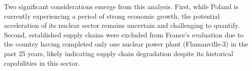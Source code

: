 Two significant considerations emerge from this analysis. First, while Poland is currently experiencing a period of strong economic growth, the potential acceleration of its nuclear sector remains uncertain and challenging to quantify. Second, established supply chains were excluded from France's evaluation due to the country having completed only one nuclear power plant (Flamanville-3) in the past 25 years, likely indicating supply chain degradation despite its historical capabilities in this sector.

